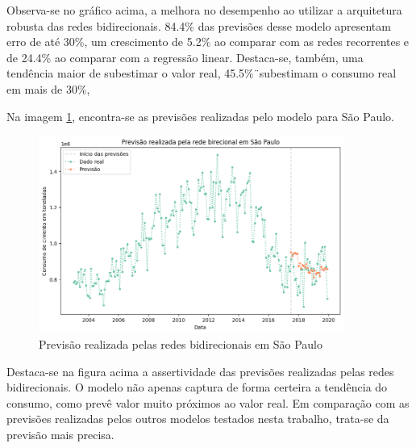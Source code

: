 Observa-se no gráfico acima, a melhora no desempenho ao utilizar a arquitetura 
robusta das redes bidirecionais. 84.4\% das previsões desse modelo apresentam 
erro de até 30\%, um crescimento de 5.2\% ao comparar com as redes recorrentes 
e de 24.4\% ao comparar com a regressão linear. Destaca-se, também, uma tendência
maior de subestimar o valor real, 45.5\%¨subestimam o consumo real em mais de 
30\%,

Na imagem \ref{img:consumo-sp-bnn}, encontra-se as previsões realizadas pelo 
modelo para São Paulo.

\begin{figure}[H]
    \centering
    \includegraphics[width=10cm]{../figuras/graficos/bi/prev-sp-bi.png}
    \caption{Previsão realizada pelas redes bidirecionais em São Paulo}
    \label{img:consumo-sp-bnn}
\end{figure}

Destaca-se na figura acima a assertividade das previsões realizadas pelas 
redes bidirecionais. O modelo não apenas captura de forma certeira a tendência 
do consumo, como prevê valor muito próximos ao valor real. Em comparação com 
as previsões realizadas pelos outros modelos testados nesta trabalho, trata-se 
da previsão mais precisa.